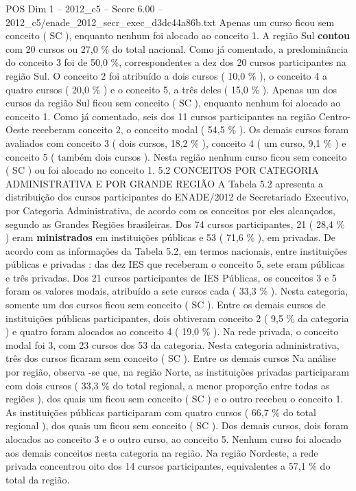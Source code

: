\begin{textsample}{POS Dim 1 – 2012\_c5 – Score 6.00 – 2012\_c5/enade\_2012\_secr\_exec\_d3dc44a86b.txt}
Apenas um curso ficou sem conceito ( SC ), enquanto nenhum foi alocado ao conceito 1.
A região Sul \textbf{contou} com 20 cursos ou 27,0 \% do total nacional.
Como já comentado, a predominância do conceito 3 foi de 50,0 \%, correspondentes a dez dos 20 cursos participantes na região Sul.
O conceito 2 foi atribuído a dois cursos ( 10,0 \% ), o conceito 4 a quatro cursos ( 20,0 \% ) e o conceito 5, a três deles ( 15,0 \% ).
Apenas um dos cursos da região Sul ficou sem conceito ( SC ), enquanto nenhum foi alocado ao conceito 1.
Como já comentado, seis dos 11 cursos participantes na região Centro-Oeste receberam conceito 2, o conceito modal ( 54,5 \% ).
Os demais cursos foram avaliados com conceito 3 ( dois cursos, 18,2 \% ), conceito 4 ( um curso, 9,1 \% ) e conceito 5 ( também dois cursos ).
Nesta região nenhum curso ficou sem conceito ( SC ) ou foi alocado no conceito 1. 5.2 CONCEITOS POR CATEGORIA ADMINISTRATIVA E POR GRANDE REGIÃO A Tabela 5.2 apresenta a distribuição dos cursos participantes do ENADE/2012 de Secretariado Executivo, por Categoria Administrativa, de acordo com os conceitos por eles alcançados, segundo as Grandes Regiões brasileiras.
Dos 74 cursos participantes, 21 ( 28,4 \% ) eram \textbf{ministrados} em instituições públicas e 53 ( 71,6 \% ), em privadas.
De acordo com as informações da Tabela 5.2, em termos nacionais, entre instituições públicas e privadas : das dez IES que receberam o conceito 5, sete eram públicas e três privadas.
Dos 21 cursos participantes de IES Públicas, os conceitos 3 e 5 foram os valores modais, atribuído a sete cursos cada ( 33,3 \% ).
Nesta categoria, somente um dos cursos ficou sem conceito ( SC ).
Entre os demais cursos de instituições públicas participantes, dois obtiveram conceito 2 ( 9,5 \% da categoria ) e quatro foram alocados ao conceito 4 ( 19,0 \% ).
Na rede privada, o conceito modal foi 3, com 23 cursos dos 53 da categoria.
Nesta categoria administrativa, três dos cursos ficaram sem conceito ( SC ).
Entre os demais cursos Na análise por região, observa -se que, na região Norte, as instituições privadas participaram com dois cursos ( 33,3 \% do total regional, a menor proporção entre todas as regiões ), dos quais um ficou sem conceito ( SC ) e o outro recebeu o conceito 1.
As instituições públicas participaram com quatro cursos ( 66,7 \% do total regional ), dos quais um ficou sem conceito ( SC ).
Dos demais cursos, dois foram alocados ao conceito 3 e o outro curso, ao conceito 5.
Nenhum curso foi alocado aos demais conceitos nesta categoria na região.
Na região Nordeste, a rede privada concentrou oito dos 14 cursos participantes, equivalentes a 57,1 \% do total da região.

\end{textsample}
